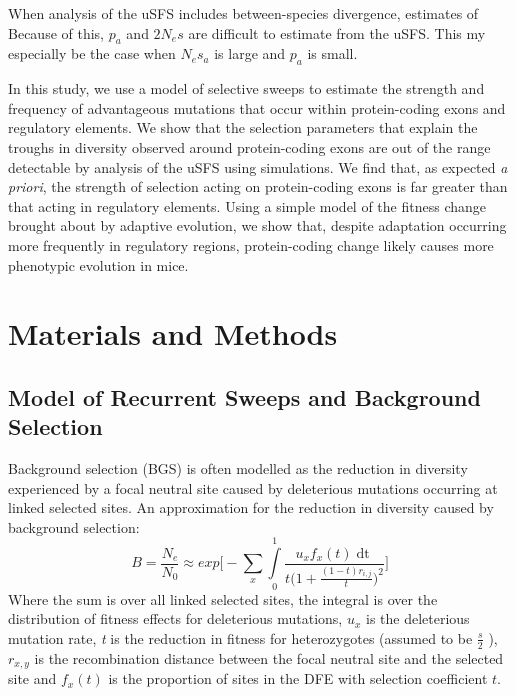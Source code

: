 \documentclass[11pt]{article}
\begin{document}
When analysis of the uSFS includes between-species divergence, estimates of 
 Because of this, $p_a$ and $2N_es$ are difficult to estimate from the uSFS. This my especially be the case when $N_es_a$ is large and $p_a$ is small.

In this study, we use a model of selective sweeps to estimate the strength and frequency of advantageous mutations that occur within protein-coding exons and regulatory elements. We show that the selection parameters that explain the troughs in diversity observed around protein-coding exons are out of the range detectable by analysis of the uSFS using simulations.  We find that, as expected \textit{a priori}, the strength of selection acting on protein-coding exons is far greater than that acting in regulatory elements. Using a simple model of the fitness change brought about by adaptive evolution, we show that, despite adaptation occurring more frequently in regulatory regions, protein-coding change likely causes more phenotypic evolution in mice.

%
%
\section*{Materials and Methods}

	\subsection*{Model of Recurrent Sweeps and Background Selection}
Background selection (BGS) is often modelled as the reduction in diversity experienced by a focal neutral site caused by deleterious mutations occurring at linked selected sites. An approximation for the reduction in diversity caused by background selection:
\begin{equation}
B = \frac{N_{e}}{N_{0}} \approx exp\Bigg[- \sum \limits_{x} \int \limits_{0}^1 \frac{u_{x}f_x(t)\mathop{dt}}{t \Big( 1 + \frac{(1-t)r_{i,j}}{t} \Big)^2} \Bigg]
\end{equation}
Where the sum is over all linked selected sites, the integral is over the distribution of fitness effects for deleterious mutations, \emph{$u_{x}$} is the deleterious mutation rate, \emph{t} is the reduction in fitness for heterozygotes (assumed to be \(\frac{s}{2}\) ), $r_{x,y}$  is the recombination distance between the focal neutral site and the selected site and $f_x(t)$ is the proportion of sites in the DFE with selection coefficient $t$.
\end{document}
